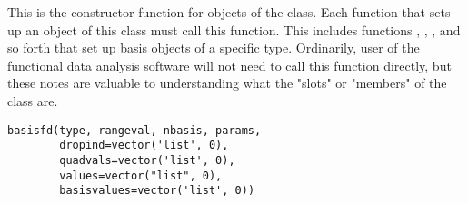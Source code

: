 \aliasA{[.basisfd}{basisfd}{[.basisfd}
\begin{Description}\relax
This is the constructor function for objects of the 
class.  Each function that sets up an object of this class must call
this function.  This includes functions ,
, , and so
forth that set up basis objects of a specific type.  Ordinarily, user
of the functional data analysis software will not need to call this
function directly, but these notes are valuable to understanding what
the "slots" or "members" of the  class are.
\end{Description}
\begin{Usage}
\begin{verbatim}
basisfd(type, rangeval, nbasis, params,
        dropind=vector('list', 0),
        quadvals=vector('list', 0),
        values=vector("list", 0),
        basisvalues=vector('list', 0))
\end{verbatim}
\end{Usage}
